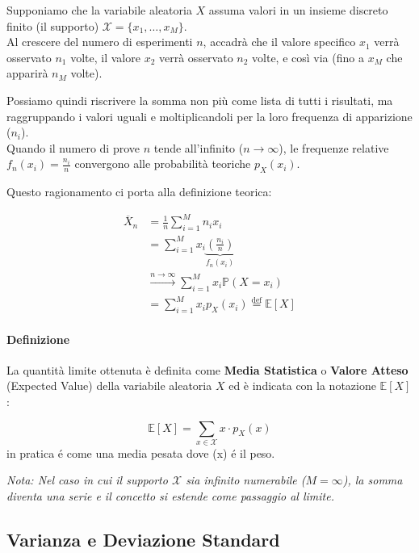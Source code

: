Supponiamo che la variabile aleatoria $X$ assuma valori in un insieme discreto finito (il supporto) $\mathcal{X} = \{x_1, \dots, x_M\}$.
\\Al crescere del numero di esperimenti $n$, accadrà che il valore specifico $x_1$ verrà osservato $n_1$ volte, il valore $x_2$ verrà osservato $n_2$ volte, e così via (fino a $x_M$ che apparirà $n_M$ volte).

Possiamo quindi riscrivere la somma non più come lista di tutti i risultati, ma raggruppando i valori uguali e moltiplicandoli per la loro frequenza di apparizione ($n_i$).
\\Quando il numero di prove $n$ tende all'infinito ($n \to \infty$), le frequenze relative $f_n(x_i) = \frac{n_i}{n}$ convergono alle probabilità teoriche $p_X(x_i)$.

Questo ragionamento ci porta alla definizione teorica:

\begin{equation}
\begin{aligned}
\overline{X}_n &= \frac{1}{n} \sum_{i=1}^M n_i x_i \\
&= \sum_{i=1}^M x_i \underbrace{\left( \frac{n_i}{n} \right)}_{f_n(x_i)} \\
&\xrightarrow{n \to \infty} \sum_{i=1}^M x_i \mathbb{P}(X = x_i) \\
&= \sum_{i=1}^M x_i p_X(x_i) \stackrel{\text{def}}{=} \mathbb{E}[X]
\end{aligned}
\end{equation}

\paragraph{Definizione}
La quantità limite ottenuta è definita come \textbf{Media Statistica} o \textbf{Valore Atteso} (Expected Value) della variabile aleatoria $X$ ed è indicata con la notazione $\mathbb{E}[X]$:

\begin{equation}
\boxed{\mathbb{E}[X] = \sum_{x \in \mathcal{X}} x \cdot p_X(x)}
\end{equation}
in pratica é come una media pesata dove (x) é il peso.

\textit{Nota: Nel caso in cui il supporto $\mathcal{X}$ sia infinito numerabile ($M=\infty$), la somma diventa una serie e il concetto si estende come passaggio al limite.}

\subsection{Varianza e Deviazione Standard}
\label{sec-varianza}


